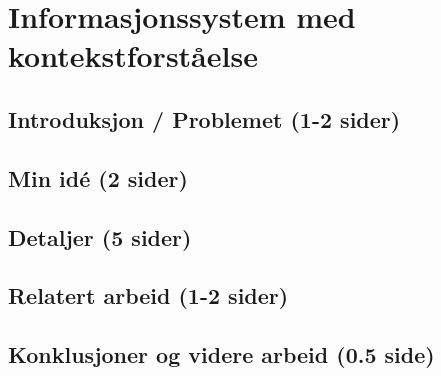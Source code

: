\section{Informasjonssystem med kontekstforståelse}
\subsection{Introduksjon / Problemet (1-2 sider)}

\subsection{Min idé (2 sider)}

\subsection{Detaljer (5 sider)}

\subsection{Relatert arbeid (1-2 sider)}

\subsection{Konklusjoner og videre arbeid (0.5 side)}
